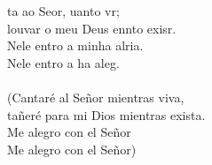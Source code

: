 \begin{cancion}%
	ta ao Seor, uanto vr;\\
	louvar o meu Deus ennto exisr.\\
	Nele entro a minha alria.\\
	Nele entro a ha aleg.\\
	\jump\\
(Cantaré al Señor mientras viva, \\
 tañeré para mi Dios mientras exista.\\
 Me alegro con el Señor\\
 Me alegro con el Señor)\\
\end{cancion}%
